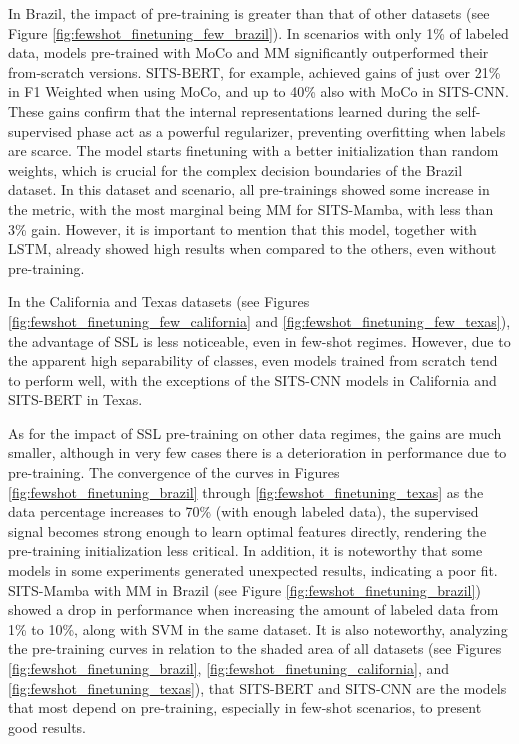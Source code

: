 In Brazil, the impact of pre-training is greater than that of other datasets (see Figure \ref{fig:fewshot_finetuning_few_brazil}). In scenarios with only 1\% of labeled data, models pre-trained with MoCo and MM significantly outperformed their from-scratch versions. SITS-BERT, for example, achieved gains of just over 21\% in F1 Weighted when using MoCo, and up to 40\% also with MoCo in SITS-CNN. These gains confirm that the internal representations learned during the self-supervised phase act as a powerful regularizer, preventing overfitting when labels are scarce. The model starts finetuning with a better initialization than random weights, which is crucial for the complex decision boundaries of the Brazil dataset. In this dataset and scenario, all pre-trainings showed some increase in the metric, with the most marginal being MM for SITS-Mamba, with less than 3\% gain. However, it is important to mention that this model, together with LSTM, already showed high results when compared to the others, even without pre-training.

In the California and Texas datasets (see Figures \ref{fig:fewshot_finetuning_few_california} and \ref{fig:fewshot_finetuning_few_texas}), the advantage of SSL is less noticeable, even in few-shot regimes. However, due to the apparent high separability of classes, even models trained from scratch tend to perform well, with the exceptions of the SITS-CNN models in California and SITS-BERT in Texas.

As for the impact of SSL pre-training on other data regimes, the gains are much smaller, although in very few cases there is a deterioration in performance due to pre-training. The convergence of the curves in Figures \ref{fig:fewshot_finetuning_brazil} through \ref{fig:fewshot_finetuning_texas} as the data percentage increases to 70\% (with enough labeled data), the supervised signal becomes strong enough to learn optimal features directly, rendering the pre-training initialization less critical. In addition, it is noteworthy that some models in some experiments generated unexpected results, indicating a poor fit. SITS-Mamba with MM in Brazil (see Figure \ref{fig:fewshot_finetuning_brazil}) showed a drop in performance when increasing the amount of labeled data from 1\% to 10\%, along with SVM in the same dataset. It is also noteworthy, analyzing the pre-training curves in relation to the shaded area of all datasets (see Figures \ref{fig:fewshot_finetuning_brazil}, \ref{fig:fewshot_finetuning_california}, and \ref{fig:fewshot_finetuning_texas}), that SITS-BERT and SITS-CNN are the models that most depend on pre-training, especially in few-shot scenarios, to present good results.

